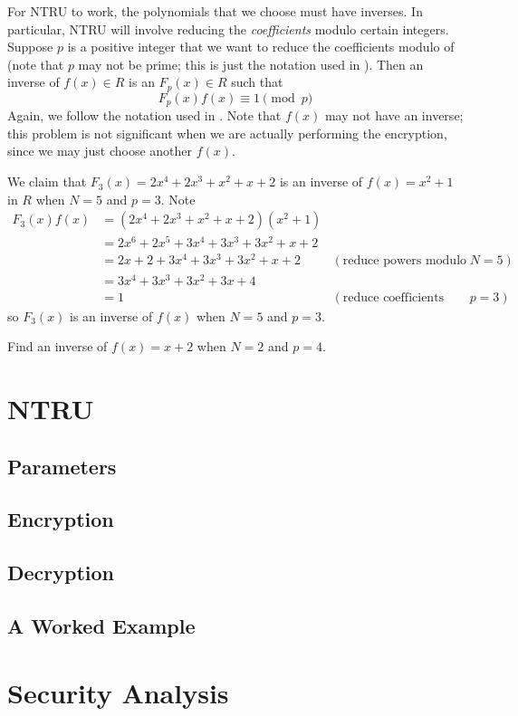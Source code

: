 For NTRU to work, the polynomials that we choose must have inverses. In particular, NTRU will involve reducing the \textit{coefficients} modulo certain integers. Suppose $p$ is a positive integer that we want to reduce the coefficients modulo of (note that $p$ may not be prime; this is just the notation used in \cite{hoffstein_pipher_silverman_1998}). Then an inverse of $f(x) \in R$ is an $F_p(x) \in R$ such that
\[
    F_p(x)f(x) \equiv 1 \pmod p
\]
Again, we follow the notation used in \cite{hoffstein_pipher_silverman_1998}. Note that $f(x)$ may not have an inverse; this problem is not significant when we are actually performing the encryption, since we may just choose another $f(x)$.

\begin{example}
    We claim that $F_3(x) = 2x^4 + 2x^3 + x^2 + x + 2$ is an inverse of $f(x) = x^2 + 1$ in $R$ when $N = 5$ and $p = 3$. Note
    \begin{align*}
        F_3(x)f(x) &= (2x^4 + 2x^3 + x^2 + x + 2)(x^2+1)\\
        &= 2x^6 + 2x^5 + 3x^4 + 3x^3 + 3x^2 + x + 2\\
        &= 2x + 2 + 3x^4 + 3x^3 + 3x^2 + x + 2 & (\text{reduce powers modulo }N = 5)\\
        &= 3x^4 + 3x^3 + 3x^2 + 3x + 4\\
        &= 1 & (\text{reduce coefficients modulo } p = 3)
    \end{align*}
    so $F_3(x)$ is an inverse of $f(x)$ when $N = 5$ and $p = 3$.
\end{example}

\begin{exercise}
    Find an inverse of $f(x) = x + 2$ when $N = 2$ and $p = 4$.
\end{exercise}

\section{NTRU}

\subsection{Parameters}

\subsection{Encryption}

\subsection{Decryption}

\subsection{A Worked Example}

\section{Security Analysis}
